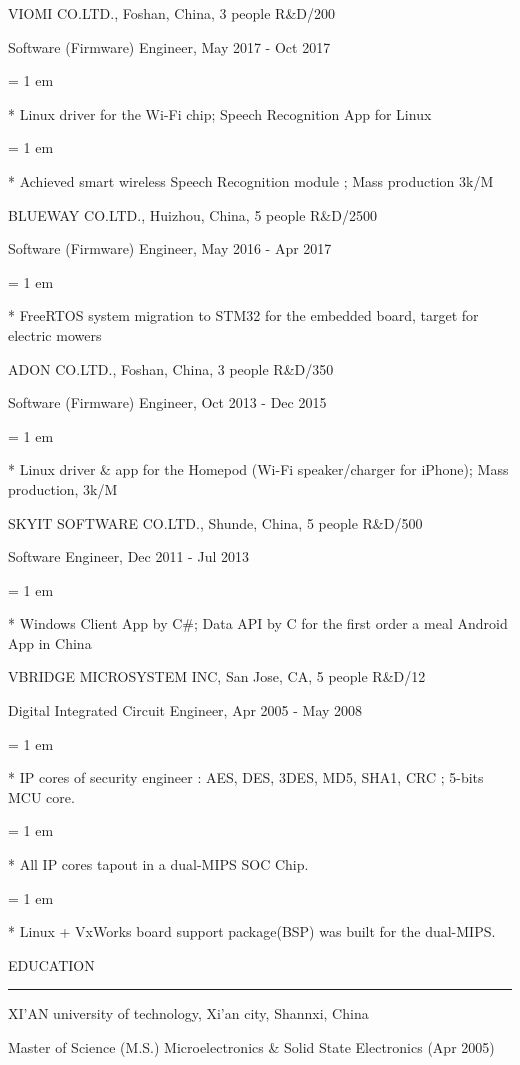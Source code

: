 { \medbreak } { \FFdd
VIOMI CO.LTD., Foshan, China, 3 people R\&D/200
}

{ \FFee
Software (Firmware) Engineer, May 2017 - Oct 2017
}

{ \parindent = 1 em \item{*}
 Linux driver for the Wi-Fi chip; Speech Recognition App for Linux
 }
{ \parindent = 1 em \item{*}
 Achieved smart wireless Speech Recognition module ; Mass production 3k/M
 }

{ \medbreak } { \FFdd
BLUEWAY CO.LTD., Huizhou, China, 5 people R\&D/2500
}

{ \FFee
Software (Firmware) Engineer, May 2016 - Apr 2017
}
{ \parindent = 1 em \item{*}
 FreeRTOS system migration to STM32 for the embedded board, target for electric mowers
 }

{ \medbreak } { \FFdd
ADON CO.LTD., Foshan, China, 3 people R\&D/350
}

{ \FFee
Software (Firmware) Engineer, Oct 2013 - Dec 2015
}
{ \parindent = 1 em \item{*}
 Linux driver \& app for the Homepod (Wi-Fi speaker/charger for iPhone); Mass production, 3k/M
 }

{ \medbreak } { \FFdd
SKYIT SOFTWARE CO.LTD., Shunde, China, 5 people R\&D/500
}

{ \FFee
Software Engineer, Dec 2011 - Jul 2013
}
{ \parindent = 1 em \item{*}
 Windows Client App by C\#; Data API by C for the first order a meal Android App in China
 }

{ \medbreak } { \FFdd
VBRIDGE MICROSYSTEM INC, San Jose, CA, 5 people R\&D/12
}

{ \FFee
Digital Integrated Circuit Engineer, Apr 2005 - May 2008
}
{ \parindent = 1 em \item{*}
 IP cores of security engineer :
 AES, DES, 3DES, MD5, SHA1, CRC ;
 5-bits MCU core.
 }
{ \parindent = 1 em \item{*}
All IP cores tapout in a dual-MIPS SOC Chip.
 }
{ \parindent = 1 em \item{*}
Linux + VxWorks board support package(BSP) was built for the dual-MIPS.
 }

{ \medbreak } { \FFdd
EDUCATION
}
{ \smallbreak } {\par\noindent\hrule} { \smallbreak }
XI'AN university of technology, Xi'an city, Shannxi, China

{ \FFee
Master of Science (M.S.) Microelectronics \& Solid State Electronics (Apr 2005)
}

